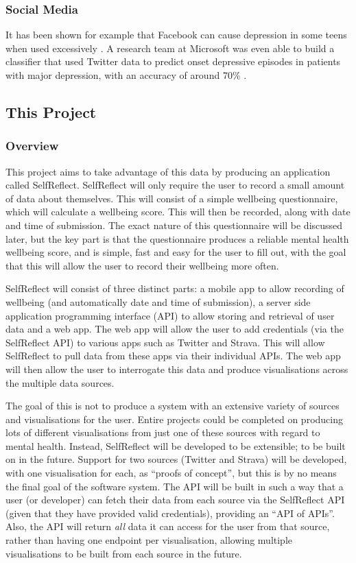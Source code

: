 \documentclass[11pt,openright,a4paper]{report}
\begin{document}
\subsubsection{Social Media}
It has been shown for example that Facebook can cause depression in some teens when used excessively \parencite{fbdepressionteens}. A research team at Microsoft was even able to build a classifier that used Twitter data to predict onset depressive episodes in patients with major depression, with an accuracy of around 70\% \parencite{de2013predicting}.

\subsection{This Project}
\subsubsection{Overview}
This project aims to take advantage of this data by producing an application called SelfReflect. SelfReflect will only require the user to record a small amount of data about themselves. This will consist of a simple wellbeing questionnaire, which will calculate a wellbeing score. This will then be recorded, along with date and time of submission. The exact nature of this questionnaire will be discussed later, but the key part is that the questionnaire produces a reliable mental health wellbeing score, and is simple, fast and easy for the user to fill out, with the goal that this will allow the user to record their wellbeing more often.

SelfReflect will consist of three distinct parts: a mobile app to allow recording of wellbeing (and automatically date and time of submission), a server side application programming interface (API) to allow storing and retrieval of user data and a web app. The web app will allow the user to add credentials (via the SelfReflect API) to various apps such as Twitter and Strava. This will allow SelfReflect to pull data from these apps via their individual APIs. The web app will then allow the user to interrogate this data and produce visualisations across the multiple data sources.

The goal of this is not to produce a system with an extensive variety of sources and visualisations for the user. Entire projects could be completed on producing lots of different visualisations from just one of these sources with regard to mental health. Instead, SelfReflect will be developed to be extensible; to be built on in the future. Support for two sources (Twitter and Strava) will be developed, with one visualisation for each, as \enquote{proofs of concept}, but this is by no means the final goal of the software system. The API will be built in such a way that a user (or developer) can fetch their data from each source via the SelfReflect API (given that they have provided valid credentials), providing an \enquote{API of APIs}. Also, the API will return \emph{all} data it can access for the user from that source, rather than having one endpoint per visualisation, allowing multiple visualisations to be built from each source in the future.
\end{document}

